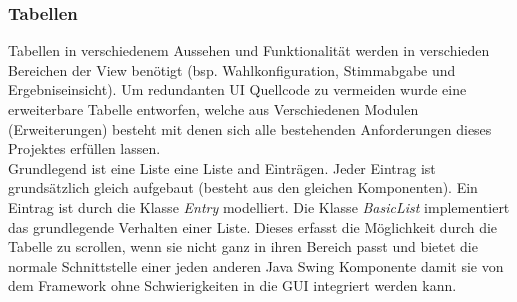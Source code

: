 \documentclass[parskip=full]{scrartcl}
\begin{document}
		\subsubsection{Tabellen}
		Tabellen in verschiedenem Aussehen und Funktionalität werden in verschieden Bereichen der View benötigt (bsp. Wahlkonfiguration, Stimmabgabe und Ergebniseinsicht). Um redundanten UI Quellcode zu vermeiden wurde eine erweiterbare Tabelle entworfen, welche aus Verschiedenen Modulen (Erweiterungen) besteht mit denen sich alle bestehenden Anforderungen dieses Projektes erfüllen lassen.
		\\
		Grundlegend ist eine Liste eine Liste and Einträgen. Jeder Eintrag ist grundsätzlich gleich aufgebaut (besteht aus den gleichen Komponenten). Ein Eintrag ist durch die Klasse \textit{Entry} modelliert. Die Klasse \textit{BasicList} implementiert das grundlegende Verhalten einer Liste. Dieses erfasst die Möglichkeit durch die Tabelle zu scrollen, wenn sie nicht ganz in ihren Bereich passt und bietet die normale Schnittstelle einer jeden anderen Java Swing Komponente damit sie von dem Framework ohne Schwierigkeiten in die GUI integriert werden kann.
		\\
\end{document}
